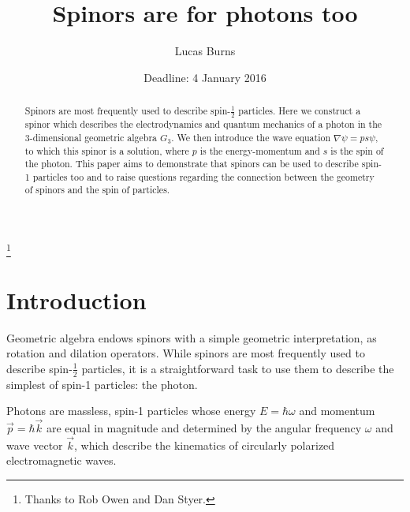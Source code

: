 \documentclass{birkjour}
\begin{document}
\title{Spinors are for photons too}

\author{Lucas Burns} 
\address{
135 W Lorain St\\
OCMR 488\\
Oberlin, OH 44074 \\
USA}

\thanks{Thanks to Rob Owen and Dan Styer.}



\date{Deadline: 4 January 2016}

\begin{abstract}
  Spinors are most frequently used to describe spin-$\frac{1}{2}$ particles. Here we construct a spinor which describes the electrodynamics and quantum mechanics of a photon in the 3-dimensional geometric algebra $G_3$. We then introduce the wave equation $\nabla \psi = p s \psi$, to which this spinor is a solution, where $p$ is the energy-momentum and $s$ is the spin of the photon. This paper aims to demonstrate that spinors can be used to describe spin-1 particles too and to raise questions regarding the connection between the geometry of spinors and the spin of particles.
\end{abstract}

\maketitle

\section{Introduction}

Geometric algebra endows spinors with a simple geometric interpretation, as rotation and dilation operators. While spinors are most frequently used to describe spin-$\frac{1}{2}$ particles, it is a straightforward task to use them to describe the simplest of spin-1 particles: the photon.

Photons are massless, spin-1 particles whose energy $E = \hbar \omega$ and momentum $\vec p = \hbar \vec k$ are equal in magnitude and determined by the angular frequency $\omega$ and wave vector $\vec k$, which describe the kinematics of circularly polarized electromagnetic waves.
\end{document}
